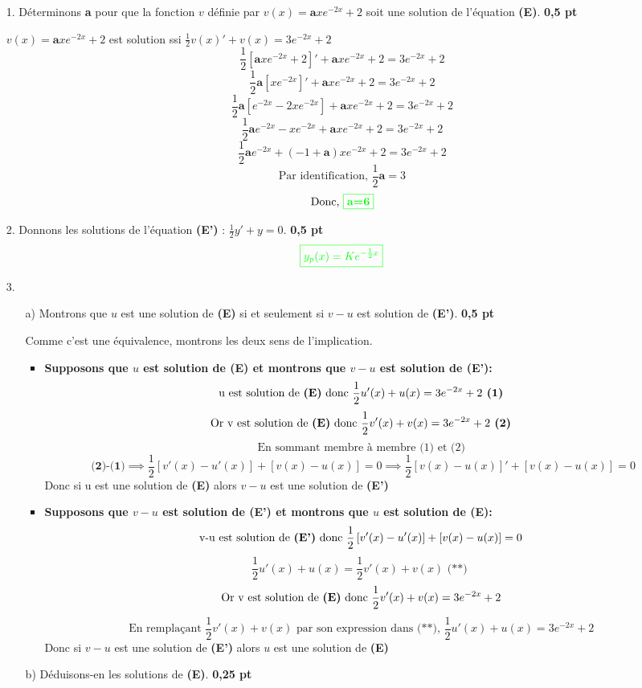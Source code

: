 \documentclass[12pt]{article}
\begin{document}
\begin{itemize}
    \item[1.] Déterminons \textbf{a} pour que la fonction $v$ définie par $v(x) = \textbf{a}xe^{-2x} + 2$ soit une solution de l'équation \textbf{(E)}. \textbf{0,5 pt}
    
$v(x) = \textbf{a}xe^{-2x} + 2$  est solution ssi $\frac{1}{2}v(x)' + v(x) = 3e^{-2x} + 2$
\[\frac{1}{2}\left[ \textbf{a}xe^{-2x} + 2\right]' + \textbf{a}xe^{-2x} + 2 = 3e^{-2x} + 2\]
\[\frac{1}{2}\textbf{a}\left[ xe^{-2x}\right]' + \textbf{a}xe^{-2x} + 2 = 3e^{-2x} + 2\]
\[\frac{1}{2}\textbf{a}\left[ e^{-2x}-2xe^{-2x}\right] + \textbf{a}xe^{-2x} + 2 = 3e^{-2x} + 2\]
\[\frac{1}{2}\textbf{a}e^{-2x}-xe^{-2x} + \textbf{a}xe^{-2x} + 2 = 3e^{-2x} + 2\]
\[\frac{1}{2}\textbf{a}e^{-2x}+\left( -1 + \textbf{a}\right)xe^{-2x}  + 2 = 3e^{-2x} + 2\]
\[\text{Par identification, }\frac{1}{2}\textbf{a}=3\]
\[\text{Donc, }\color{green}{\boxed{\textbf{a=6}}}\]

    \item[2.] Donnons les solutions de l'équation \textbf{(E')} : $\frac{1}{2}y' + y = 0$. \textbf{0,5 pt}
\[\color{green}{\boxed{y_{p}(x)=Ke^{-\frac{1}{2}x}}}\]
    \item[3.] 
    \begin{itemize}
        \item[a)] Montrons que $u$ est une solution de \textbf{(E)} si et seulement si $v - u$ est solution de \textbf{(E')}. \textbf{0,5 pt}
        
        Comme c'est une équivalence, montrons les deux sens de l'implication.
        \begin{itemize}
        \item  \textbf{Supposons que $u$ est solution de \textbf{(E)} et montrons que $v - u$ est solution de \textbf{(E')}:}
        \[\text{u est solution de \textbf{(E)} donc }\frac{1}{2}u'(x) + u(x) =3e^{-2x} + 2 \textbf{ (1)}\]
        \[\text{Or v est solution de \textbf{(E)} donc }\frac{1}{2}v'(x)+v(x)= 3e^{-2x} + 2 \textbf{ (2)}\]
        \[\text{En sommant membre à membre (1) et (2)}\]
        \[\textbf{ (2)-(1)} \implies  \frac{1}{2}\left[ v'(x) - u'(x) \right]+\left[v(x) - u(x)\right]=0	\implies \frac{1}{2}\left[ v(x) - u(x) \right]'+\left[v(x) - u(x)\right]=0\]
        Donc si u est une solution de \textbf{(E)} alors $v - u$ est une solution de \textbf{(E')}
        \item  \textbf{Supposons que $v - u$ est solution de \textbf{(E')} et montrons que $u$ est solution de \textbf{(E)}:}
        \[\text{v-u est solution de \textbf{(E')} donc }\frac{1}{2}\left[ v'(x) - u'(x) \right]+\left[v(x) - u(x)\right]=0\]
        \[\frac{1}{2}u'(x) + u(x)=\frac{1}{2}v'(x) + v(x) \textbf{ (**) }\]
                \[\text{Or v est solution de \textbf{(E)} donc }\frac{1}{2}v'(x)+v(x)= 3e^{-2x} + 2\]
        \[\text{En remplaçant } \frac{1}{2}v'(x)+v(x) \text{ par son expression dans } \textbf{(**), } \frac{1}{2}u'(x) + u(x)=3e^{-2x} + 2\]
        Donc si $v - u$ est une solution de \textbf{(E')} alors $u$ est une solution de \textbf{(E)}
        \end{itemize}
        \item[b)] Déduisons-en les solutions de \textbf{(E)}. \textbf{0,25 pt}
        

\end{itemize}
\end{itemize}
\end{document}
